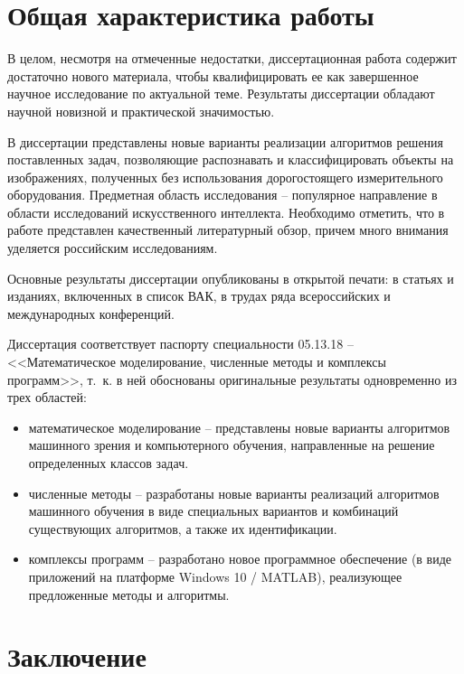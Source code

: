 \documentclass[12pt]{extarticle}
\begin{document}
\section{Общая характеристика работы}

В целом, несмотря на отмеченные недостатки, диссертационная работа содержит достаточно нового материала, чтобы квалифицировать ее как завершенное научное исследование по актуальной теме.  Результаты диссертации обладают научной новизной и практической значимостью.

В диссертации представлены новые варианты реализации алгоритмов решения поставленных задач, позволяющие распознавать и классифицировать объекты на изображениях, полученных без использования дорогостоящего измерительного оборудования.
Предметная область исследования -- популярное направление в области исследований искусственного интеллекта. Необходимо отметить, что в работе представлен качественный литературный обзор, причем много внимания уделяется российским исследованиям.

Основные результаты диссертации опубликованы в открытой печати: в статьях и изданиях, включенных в список ВАК, в трудах ряда всероссийских и международных конференций. %

Диссертация соответствует паспорту специальности 05.13.18 -- <<Математическое моделирование, численные методы и комплексы программ>>, т.~к. в ней обоснованы оригинальные результаты одновременно из трех областей:
\begin{itemize}
\item математическое моделирование -- представлены новые варианты алгоритмов машинного зрения и компьютерного обучения, направленные на решение определенных классов задач.

\item численные методы -- разработаны новые варианты реализаций алгоритмов машинного обучения в виде специальных вариантов и комбинаций существующих алгоритмов, а также их идентификации.

\item комплексы программ -- разработано новое программное обеспечение (в виде приложений на платформе Windows 10 / MATLAB), реализующее предложенные методы и алгоритмы.
\end{itemize}

\section*{Заключение}
\label{sec-conc}
\end{document}
